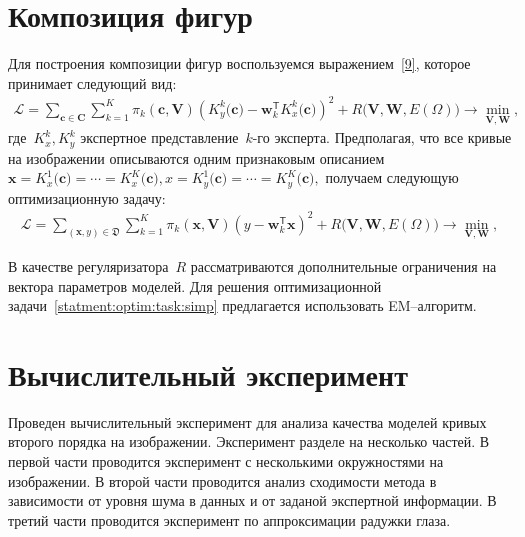 \documentclass[12pt, twoside]{article}
\numberwithin{equation}{section}
\begin{document}
\section{Композиция фигур}
Для построения композиции фигур воспользуемся выражением~\eqref{9}, которое принимает следующий вид:
\begin{equation} 
\label{statment:optim:task}
\begin{aligned}
\mathcal{L} = \sum\limits_{\mathbf{c} \in \mathbf{C}} \sum\limits_{k = 1}^{K} \pi_k(\mathbf{c}, \mathbf{V})\left(K^{k}_y\bigr(\mathbf{c}\bigr) - \mathbf{w}_k^{\mathsf{T}}K^{k}_x\bigr(\mathbf{c}\bigr)\right)^2 + R\bigl(\mathbf{V}, \mathbf{W}, E(\Omega)\bigr) \rightarrow \min_{\mathbf{V}, \mathbf{W}},
\end{aligned}
\end{equation} 
где~$K^{k}_x, K^{k}_y$ экспертное представление~$k$-го эксперта. Предполагая, что все кривые на изображении описываются одним признаковым описанием $\mathbf{x} = K^{1}_x\bigr(\mathbf{c}\bigr)=\cdots=K^{K}_x\bigr(\mathbf{c}\bigr), x= K^{1}_y\bigr(\mathbf{c}\bigr)=\cdots=K^{K}_y\bigr(\mathbf{c}\bigr),$ получаем следующую оптимизационную задачу:
\begin{equation} 
\label{statment:optim:task:simp}
\begin{aligned}
\mathcal{L} = \sum\limits_{\left(\mathbf{x}, y\right) \in \mathfrak{D}} \sum\limits_{k = 1}^{K} \pi_k(\mathbf{x}, \mathbf{V})\left(y - \mathbf{w}_k^{\mathsf{T}}\mathbf{x}\right)^2 + R\bigl(\mathbf{V}, \mathbf{W}, E(\Omega)\bigr) \rightarrow \min_{\mathbf{V}, \mathbf{W}},
\end{aligned}
\end{equation} 

В качестве регуляризатора~$R$ рассматриваются дополнительные ограничения на вектора параметров моделей. Для решения оптимизационной задачи~\eqref{statment:optim:task:simp} предлагается использовать EM--алгоритм.

\section{Вычислительный эксперимент}
Проведен вычислительный эксперимент для анализа качества моделей кривых второго порядка на изображении. Эксперимент разделе на несколько частей. В первой части проводится эксперимент с несколькими окружностями на изображении. В второй части проводится анализ сходимости метода в зависимости от уровня шума в данных и от заданой экспертной информации. В третий части проводится эксперимент по аппроксимации радужки глаза.
\end{document}
